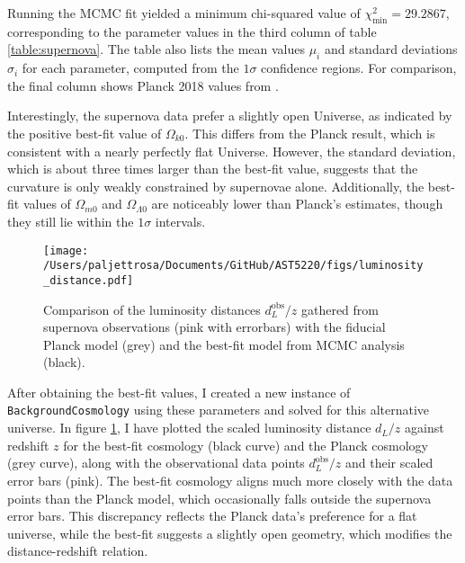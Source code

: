 \documentclass{aa}
\numberwithin{equation}{section}
\numberwithin{table}{section}
\numberwithin{figure}{section}
\begin{document}

Running the MCMC fit yielded a minimum chi-squared value of $\chi^2_\text{min} = 29.2867$, corresponding to the parameter values in the third column of table \ref{table:supernova}. The table also lists the mean values $\mu_i$ and standard deviations $\sigma_i$ for each parameter, computed from the $1\sigma$ confidence regions. For comparison, the final column shows Planck 2018 values from \cite{Planck}.

Interestingly, the supernova data prefer a slightly open Universe, as indicated by the positive best-fit value of $\Omega_{k0}$. This differs from the Planck result, which is consistent with a nearly perfectly flat Universe. However, the standard deviation, which is about three times larger than the best-fit value, suggests that the curvature is only weakly constrained by supernovae alone. Additionally, the best-fit values of $\Omega_{m0}$ and $\Omega_{\Lambda0}$ are noticeably lower than Planck's estimates, though they still lie within the $1\sigma$ intervals.


\begin{figure}
    \centering
    \texttt{[image: /Users/paljettrosa/Documents/GitHub/AST5220/figs/luminosity\_distance.pdf]}
    \caption{Comparison of the luminosity distances $d_L^\text{obs}/z$ gathered from supernova observations (pink with errorbars) with the fiducial Planck model (grey) and the best-fit model from MCMC analysis (black).}\label{fig:luminosity distance}
\end{figure}

After obtaining the best-fit values, I created a new instance of \verb|BackgroundCosmology| using these parameters and solved for this alternative universe. In figure \ref{fig:luminosity distance}, I have plotted the scaled luminosity distance $d_L/z$ against redshift $z$ for the best-fit cosmology (black curve) and the Planck cosmology (grey curve), along with the observational data points $d_L^\text{obs}/z$ and their scaled error bars (pink). The best-fit cosmology aligns much more closely with the data points than the Planck model, which occasionally falls outside the supernova error bars. This discrepancy reflects the Planck data's preference for a flat universe, while the best-fit suggests a slightly open geometry, which modifies the distance-redshift relation.
\end{document}
